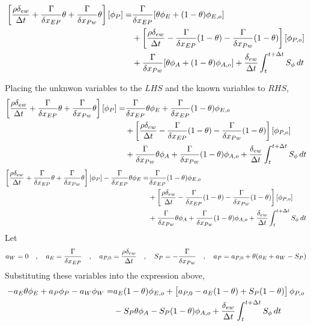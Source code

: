 \documentclass[class=report, 12pt, crop=false]{standalone}
\begin{document}
\begin{center}
\begin{equation*}
\begin{split}
\left[\frac{\rho\delta_{ew}}{\Delta t} + \frac{\Gamma}{\delta x_{EP}}\theta + \frac{\Gamma}{\delta x_{Pw}}\theta\right][\phi_{P}] = & \frac{\Gamma }{\delta x_{EP}}[\theta\phi_{E} + (1-\theta)\phi_{E,o}]\\ & +\left[\frac{\rho\delta_{ew}}{\Delta t} - \frac{\Gamma }{\delta x_{EP}}(1-\theta) - \frac{\Gamma }{\delta x_{Pw}}(1-\theta)\right][\phi_{P,o}] \\ &  + \frac{\Gamma }{\delta x_{Pw}}[\theta\phi_{A} + (1-\theta)\phi_{A,o}] + \frac{\delta_{ew}}{\Delta t}\int^{t+\Delta t}_{t} S_\phi\,dt 
\end{split}
\end{equation*}

Placing the unknwon variables to the $LHS$ and the known variables to $RHS$,
\begin{equation*}
\begin{split}
\left[\frac{\rho\delta_{ew}}{\Delta t} + \frac{\Gamma}{\delta x_{EP}}\theta + \frac{\Gamma}{\delta x_{Pw}}\theta\right][\phi_{P}] = & \frac{\Gamma }{\delta x_{EP}}\theta\phi_{E} + \frac{\Gamma }{\delta x_{EP}}(1-\theta)\phi_{E,o}\\ & +\left[\frac{\rho\delta_{ew}}{\Delta t} - \frac{\Gamma }{\delta x_{EP}}(1-\theta) - \frac{\Gamma }{\delta x_{Pw}}(1-\theta)\right][\phi_{P,o}] \\ &  + \frac{\Gamma }{\delta x_{Pw}}\theta\phi_{A} + \frac{\Gamma }{\delta x_{Pw}}(1-\theta)\phi_{A,o} + \frac{\delta_{ew}}{\Delta t}\int^{t+\Delta t}_{t} S_\phi\,dt 
\end{split}
\end{equation*}
\begin{equation*}
\begin{split}
\left[\frac{\rho\delta_{ew}}{\Delta t} + \frac{\Gamma}{\delta x_{EP}}\theta + \frac{\Gamma}{\delta x_{Pw}}\theta\right][\phi_{P}]  -\frac{\Gamma }{\delta x_{EP}}\theta\phi_{E} = &\frac{\Gamma }{\delta x_{EP}}(1-\theta)\phi_{E,o}\\ & +\left[\frac{\rho\delta_{ew}}{\Delta t} - \frac{\Gamma }{\delta x_{EP}}(1-\theta) - \frac{\Gamma }{\delta x_{Pw}}(1-\theta)\right][\phi_{P,o}] \\ &  + \frac{\Gamma }{\delta x_{Pw}}\theta\phi_{A} + \frac{\Gamma }{\delta x_{Pw}}(1-\theta)\phi_{A,o} + \frac{\delta_{ew}}{\Delta t}\int^{t+\Delta t}_{t} S_\phi\,dt 
\end{split}
\end{equation*}
Let
$$a_W = 0 \quad,\quad a_E = \frac{\Gamma}{\delta x_{EP}} \quad,\quad a_{P,0} = \frac{\rho\delta_{ew}}{\Delta t} \quad,\quad S_P = -\frac{\Gamma}{\delta x_{Pw}} \quad,\quad a_{P} = a_{P,0} + \theta(a_E + a_W - S_P)$$
Substituting these variables into the expression above,
\begin{equation*}
\begin{split}
 - a_E\theta\phi_{E} + a_P\phi_{P} - a_W\phi_W = & a_E(1-\theta)\phi_{E,o} +\left[a_{P,0} - a_E(1-\theta) + S_P(1-\theta)\right]\phi_{P,o} \\ &  - S_P\theta\phi_{A} - S_P(1-\theta)\phi_{A,o} + \frac{\delta_{ew}}{\Delta t}\int^{t+\Delta t}_{t} S_\phi\,dt 
\end{split}
\end{equation*}



\end{center}
\end{document}
